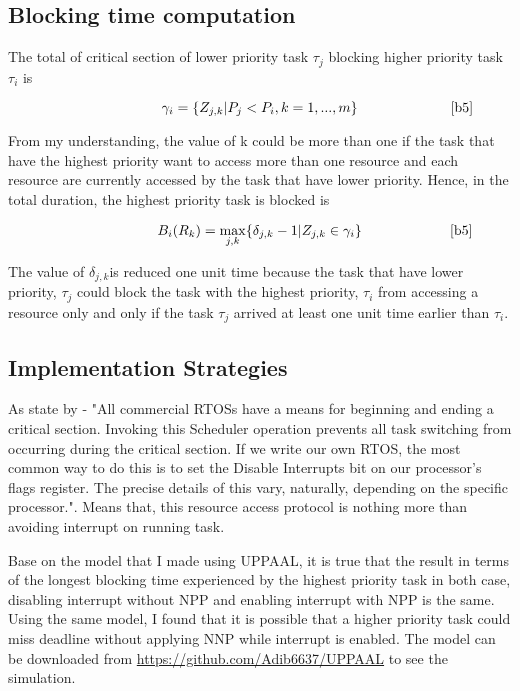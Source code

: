 \subsection{Blocking time computation}

	The total of critical section of lower priority task $\tau_{j}$ blocking higher priority task $\tau_{i}$ is

\begin{equation}
\citeequation{ \gamma_{i}=\{Z_{j,k} | P_{j}<P_{i}, k=1,...,m \}}{b5}\label{eq6}
\end{equation}

From my understanding, the value of k could be more than one if the task that have the highest priority want to access more than one resource and each resource are currently accessed by the task that have lower priority. Hence, in the total duration, the highest priority task is blocked is

\begin{equation}
\citeequation{B_{i}(R_{k})=\underset{j,k}{\mathrm{max}} \{ \delta_{j,k}-1 | Z_{j,k} \in \gamma_{i}\}}{b5}\label{eq7}
\end{equation}


The value of $\delta_{j,k}$is reduced one unit time because the task that have lower priority, $\tau_{j}$ could block the task with the highest priority, $\tau_{i}$ from accessing a resource only and only if the task $\tau_{j}$  arrived at least one unit time earlier than $\tau_{i}$.

\subsection{Implementation Strategies}

As state by \cite{b6} - "All commercial RTOSs have a means for beginning and ending a critical section. Invoking this Scheduler operation prevents all task switching from occurring during the critical section. If we write our own RTOS, the most common way to do this is to set the Disable Interrupts bit on our processor's flags register. The precise details of this vary, naturally, depending on the specific processor.". Means that, this resource access protocol is nothing more than avoiding interrupt on running task. 

Base on the model that I made using UPPAAL, it is true that the result in terms of the longest blocking time experienced by the highest priority task in both case, disabling interrupt without NPP and enabling interrupt with NPP is the same. Using the same model, I found that it is possible that a higher priority task could miss deadline without applying NNP while interrupt is enabled. The model can be downloaded from \url{https://github.com/Adib6637/UPPAAL} to see the simulation.

